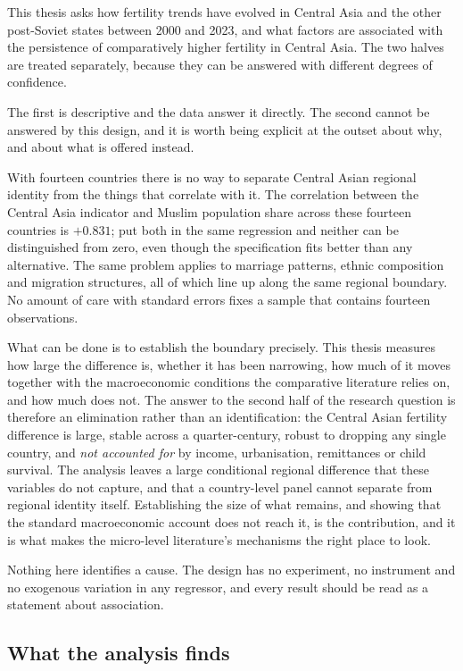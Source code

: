 This thesis asks how fertility trends have evolved in Central Asia and the other post-Soviet states between 2000 and 2023, and what factors are associated with the persistence of comparatively higher fertility in Central Asia. The two halves are treated separately, because they can be answered with different degrees of confidence.

The first is descriptive and the data answer it directly. The second cannot be answered by this design, and it is worth being explicit at the outset about why, and about what is offered instead.

With fourteen countries there is no way to separate Central Asian regional identity from the things that correlate with it. The correlation between the Central Asia indicator and Muslim population share across these fourteen countries is $+0.831$; put both in the same regression and neither can be distinguished from zero, even though the specification fits better than any alternative. The same problem applies to marriage patterns, ethnic composition and migration structures, all of which line up along the same regional boundary. No amount of care with standard errors fixes a sample that contains fourteen observations.

What can be done is to establish the boundary precisely. This thesis measures how large the difference is, whether it has been narrowing, how much of it moves together with the macroeconomic conditions the comparative literature relies on, and how much does not. The answer to the second half of the research question is therefore an elimination rather than an identification: the Central Asian fertility difference is large, stable across a quarter-century, robust to dropping any single country, and \emph{not accounted for} by income, urbanisation, remittances or child survival. The analysis leaves a large conditional regional difference that these variables do not capture, and that a country-level panel cannot separate from regional identity itself. Establishing the size of what remains, and showing that the standard macroeconomic account does not reach it, is the contribution, and it is what makes the micro-level literature's mechanisms the right place to look.

Nothing here identifies a cause. The design has no experiment, no instrument and no exogenous variation in any regressor, and every result should be read as a statement about association.

\subsection{What the analysis finds}
\label{sec:preview}

